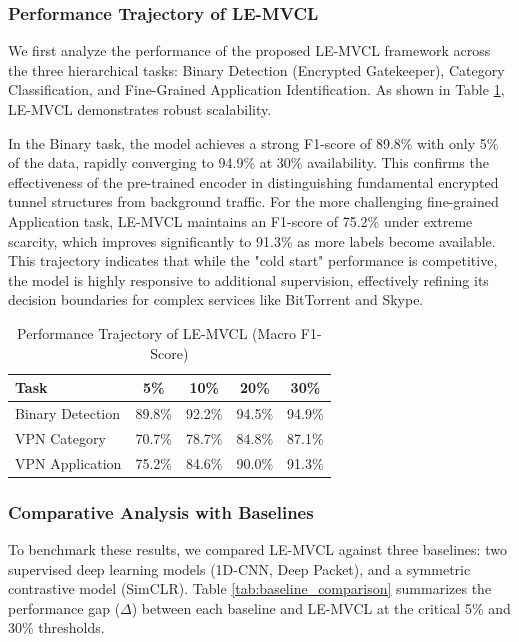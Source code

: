 \subsubsection{Performance Trajectory of LE-MVCL}
We first analyze the performance of the proposed LE-MVCL framework across the three hierarchical tasks: Binary Detection (Encrypted Gatekeeper), Category Classification, and Fine-Grained Application Identification. As shown in Table \ref{tab:lemvcl_trajectory}, LE-MVCL demonstrates robust scalability.

In the Binary task, the model achieves a strong F1-score of 89.8\% with only 5\% of the data, rapidly converging to 94.9\% at 30\% availability. This confirms the effectiveness of the pre-trained encoder in distinguishing fundamental encrypted tunnel structures from background traffic. For the more challenging fine-grained Application task, LE-MVCL maintains an F1-score of 75.2\% under extreme scarcity, which improves significantly to 91.3\% as more labels become available. This trajectory indicates that while the "cold start" performance is competitive, the model is highly responsive to additional supervision, effectively refining its decision boundaries for complex services like BitTorrent and Skype.

\begin{table}[htbp]
\caption{Performance Trajectory of LE-MVCL (Macro F1-Score)}
\label{tab:lemvcl_trajectory}
\centering
\begin{tabular}{l c c c c}
\hline
\textbf{Task} & \textbf{5\%} & \textbf{10\%} & \textbf{20\%} & \textbf{30\%} \\
\hline
Binary Detection & 89.8\% & 92.2\% & 94.5\% & 94.9\% \\
VPN Category & 70.7\% & 78.7\% & 84.8\% & 87.1\% \\
VPN Application & 75.2\% & 84.6\% & 90.0\% & 91.3\% \\
\hline
\end{tabular}
\end{table}

\subsubsection{Comparative Analysis with Baselines}
To benchmark these results, we compared LE-MVCL against three baselines: two supervised deep learning models (1D-CNN, Deep Packet), and a symmetric contrastive model (SimCLR). Table \ref{tab:baseline_comparison} summarizes the performance gap ($\Delta$) between each baseline and LE-MVCL at the critical 5\% and 30\% thresholds.

